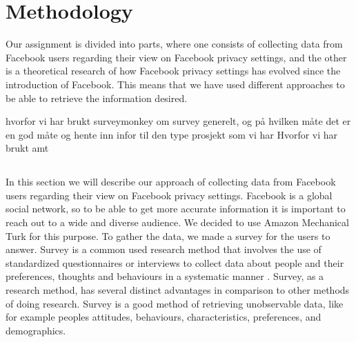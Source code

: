 \chapter{Methodology}
\label{chp:relatedwork} 

Our assignment is divided into parts, where one consists of collecting data from Facebook users regarding their view on Facebook privacy settings, and the other is a theoretical research of how Facebook privacy settings has evolved since the introduction of Facebook. This means that we have used different approaches to be able to retrieve the information desired.

hvorfor vi har brukt surveymonkey
om survey generelt, og på hvilken måte det er en god måte og hente inn infor til den type prosjekt som vi har
Hvorfor vi har brukt amt

\section{}
In this section we will describe our approach of collecting data from Facebook users regarding their view on Facebook privacy settings. Facebook is a global social network, so to be able to get more accurate information it is important to reach out to a wide and diverse audience. We decided to use Amazon Mechanical Turk for this purpose. To gather the data, we made a survey for the users to answer. Survey is a common used research method that involves the use of standardized questionnaires or interviews to collect data about people and their preferences, thoughts and behaviours in a systematic manner \cite{survey}. Survey, as a research method, has several distinct advantages in comparison to other methods of doing research. Survey is a good method of retrieving unobservable data, like for example peoples attitudes, behaviours, characteristics, preferences, and demographics. 
